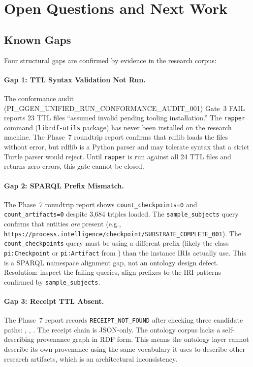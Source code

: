 
\section{Open Questions and Next Work}
\label{sec:research-open-ontologies-open-questions}

\subsection{Known Gaps}
\label{sec:research-open-ontologies-gaps}

Four structural gaps are confirmed by evidence in the research corpus:

\paragraph{Gap 1: TTL Syntax Validation Not Run.}
The conformance audit (PI\_GGEN\_UNIFIED\_RUN\_CONFORMANCE\_AUDIT\_001) Gate~3 FAIL
reports 23 TTL files ``assumed invalid pending tooling installation.'' The \texttt{rapper}
command (\texttt{librdf-utils} package) has never been installed on the research machine.
The Phase~7 roundtrip report confirms that rdflib loads the files without error, but rdflib
is a Python parser and may tolerate syntax that a strict Turtle parser would reject. Until
\texttt{rapper} is run against all 24 TTL files and returns zero errors, this gate cannot
be closed.

\paragraph{Gap 2: SPARQL Prefix Mismatch.}
The Phase~7 roundtrip report shows \texttt{count\_checkpoints=0} and
\texttt{count\_artifacts=0} despite 3{,}684 triples loaded. The \texttt{sample\_subjects}
query confirms that entities \emph{are} present (e.g.,
\texttt{https://process.intelligence/checkpoint/SUBSTRATE\_COMPLETE\_001}). The
\texttt{count\_checkpoints} query must be using a different prefix (likely the class
\texttt{pi:Checkpoint} or \texttt{pi:Artifact} from ) than the
instance IRIs actually use. This is a SPARQL namespace alignment gap, not an ontology
design defect. Resolution: inspect the failing queries, align prefixes to the IRI patterns
confirmed by \texttt{sample\_subjects}.

\paragraph{Gap 3: Receipt TTL Absent.}
The Phase~7 report records \texttt{RECEIPT\_NOT\_FOUND} after checking three candidate paths:
, , . The receipt
chain is JSON-only. The ontology corpus lacks a self-describing provenance graph in RDF
form. This means the ontology layer cannot describe its own provenance using the same
vocabulary it uses to describe other research artifacts, which is an architectural
inconsistency.

